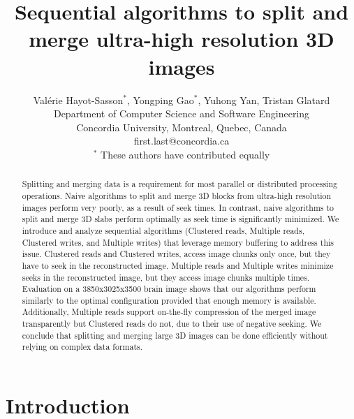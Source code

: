 \documentclass[10pt, conference, compsocconf]{IEEEtran}
\begin{document}
\title{Sequential algorithms to split and merge ultra-high resolution 3D images}

\author{Val\'erie Hayot-Sasson$^*$, Yongping Gao$^*$, Yuhong Yan, Tristan Glatard\\
  Department of Computer Science and Software Engineering\\ Concordia University, Montreal, Quebec, Canada\\
  {first.last}@concordia.ca\\
  $^*$ These authors have contributed equally
  
}

\maketitle

\begin{abstract}
  Splitting and merging data is a requirement for most parallel or
  distributed processing operations. Naive algorithms to split and
  merge 3D blocks from ultra-high resolution images perform very poorly,
  as a result of seek times. In contrast, naive algorithms to split and 
  merge 3D slabs perform optimally as seek time is significantly minimized.
  We introduce and analyze sequential algorithms (Clustered reads, Multiple reads, Clustered writes, and Multiple writes)
  that leverage memory buffering to
  address this issue. Clustered reads and Clustered writes, access
  image chunks only once, but they have to seek in the reconstructed
  image. Multiple reads and Multiple writes minimize seeks in the
  reconstructed image, but they access image chunks multiple
  times. Evaluation on a 3850x3025x3500 brain image shows that our
  algorithms perform similarly to the optimal configuration provided that enough memory is available. 
  Additionally, Multiple reads support on-the-fly compression of the 
  merged image transparently but Clustered reads do not, due to their use of negative seeking. We
  conclude that splitting and merging large 3D images can be done
  efficiently without relying on complex data formats.
\end{abstract}


\section{Introduction}
\end{document}
